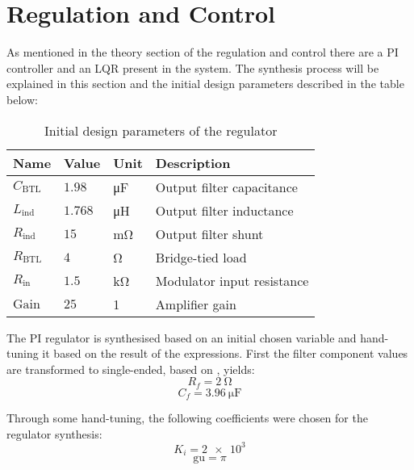 \section{Regulation and Control}
As mentioned in the theory section of the regulation and control there are a PI controller and an LQR present in the system. The synthesis process will be explained in this section and the initial design parameters described in the table below:
\begin{table}[htbp]
	\centering
	\begin{tabular}{@{}llll@{}}
		\toprule
		\multicolumn{1}{c}{\textbf{Name}} & \textbf{Value} & \textbf{Unit} & \textbf{Description} \\ \midrule
		$C_{\mathrm{BTL}}$ & $1.98$ & \si{\micro\farad} & Output filter capacitance \\
		$L_{\mathrm{ind}}$ & $1.768$ & \si{\micro\henry} & Output filter inductance \\
		$R_{\mathrm{ind}}$ & $15$  & \si{\milli\ohm}  & Output filter shunt \\
		$R_{\mathrm{BTL}}$ & $4$  & \si{\ohm}  & Bridge-tied load \\
		$R_{\mathrm{in}}$ & $1.5$  & \si{\kilo\ohm}  & Modulator input resistance \\ 
		$\mathrm{Gain}$ & $25$ & \si{1} & Amplifier gain \\ \bottomrule
	\end{tabular}
	\caption{Initial design parameters of the regulator}
	\label{tab:design_parameters_regulator}
\end{table}

The PI regulator is synthesised based on an initial chosen variable and hand-tuning it based on the result of the expressions. First the filter component values are transformed to single-ended, based on , yields:
$$R_{f} = \SI{2}{\ohm}$$
$$C_{f} = \SI{3.96}{\micro\farad}$$

Through some hand-tuning, the following coefficients were chosen for the regulator synthesis:
$$K_{i} = \num{2e3}$$
$$\mathrm{gu} = \pi$$

